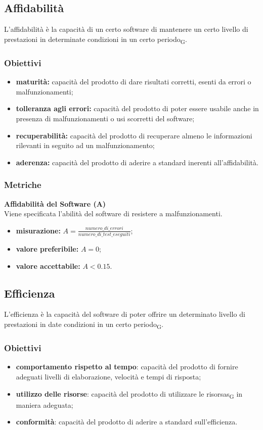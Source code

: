 \subsection{Affidabilità}
L'affidabilità è la capacità di un certo software di mantenere un certo livello di prestazioni in determinate condizioni in un certo \gls{periodo}\textsubscript{G}.
\subsubsection{Obiettivi}
\begin{itemize}
	\item \textbf{maturità:} capacità del prodotto di dare risultati corretti, esenti da errori o malfunzionamenti;
	\item \textbf{tolleranza agli errori:} capacità del prodotto di poter essere usabile anche in presenza di malfunzionamenti o usi scorretti del software;
	\item \textbf{recuperabilità:} capacità del prodotto di recuperare almeno le informazioni rilevanti in seguito ad un malfunzionamento;
	\item \textbf{aderenza:} capacità del prodotto di aderire a standard inerenti all'affidabilità.
\end{itemize}
\subsubsection{Metriche}
\textbf{Affidabilità del Software (A)}\\
Viene specificata l'abilità del software di resistere a malfunzionamenti.
\begin{itemize}
	\item \textbf{misurazione:} $A = \frac{numero\_di\_errori}{numero\_di\_test\_eseguiti}$;
	\item \textbf{valore preferibile:} $A = 0$;
	\item \textbf{valore accettabile:} $A < 0.15$.
\end{itemize}

\subsection{Efficienza}
L'efficienza è la capacità del software di poter offrire un determinato livello di prestazioni in date condizioni in un certo \gls{periodo}\textsubscript{G}.
\subsubsection{Obiettivi}
\begin{itemize}
	\item \textbf{comportamento rispetto al tempo}: capacità del prodotto di fornire adeguati livelli di elaborazione, velocità e tempi di risposta;
	\item \textbf{utilizzo delle risorse}: capacità del prodotto di utilizzare le \glspl{risorsa}\textsubscript{G} in maniera adeguata;
	\item \textbf{conformità}: capacità del prodotto di aderire a standard sull'efficienza.
\end{itemize}
